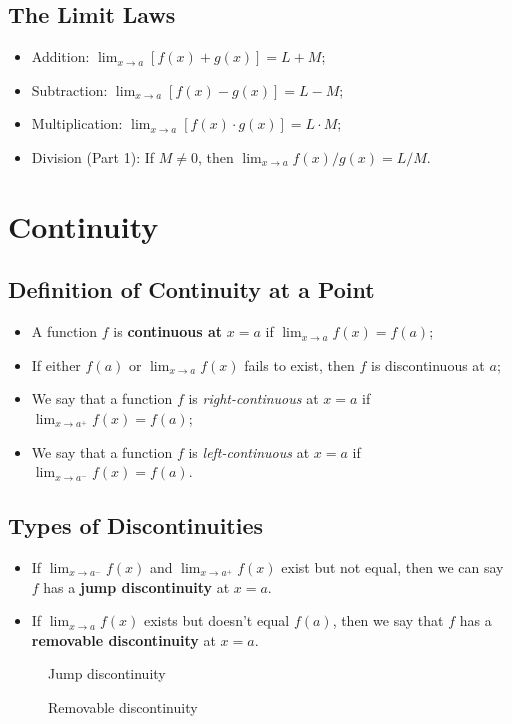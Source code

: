 \subsection{The Limit Laws}
\begin{itemize}
\item Addition: $\lim_{x\to a}[f(x)+g(x)]=L+M$;
\item Subtraction: $\lim_{x\to a}[f(x)-g(x)]=L-M$;
\item Multiplication: $\lim_{x\to a}[f(x)\cdot g(x)]=L\cdot M$;
\item Division (Part 1): If $M\neq 0$, then $\lim_{x\to a}f(x)/g(x)=L/M$.
\end{itemize}


\section{Continuity}
\subsection{Definition of Continuity at a Point}
\begin{itemize}
\item A function $f$ is \textbf{continuous at} $x=a$ if $\lim_{x\to a}f(x)=f(a)$;
\item If either $f(a)$ or $\lim_{x\to a} f(x)$ fails to exist, then $f$ is discontinuous at $a$;
\item We say that a function $f$ is \textit{right-continuous} at $x=a$ if $\lim_{x\to a^+}f(x)=f(a)$;
\item We say that a function $f$ is \textit{left-continuous} at $x=a$ if $\lim_{x\to a^-}f(x)=f(a)$.
\end{itemize}

\subsection{Types of Discontinuities}
\begin{itemize}
  \item If $\lim_{x\to a^-}f(x)$ and $\lim_{x\to a^+}f(x)$ exist but not equal, then we can say $f$ has a \textbf{jump discontinuity} at $x=a$.
  \item If $\lim_{x\to a}f(x)$ exists but doesn't equal $f(a)$, then we say that $f$ has a \textbf{removable discontinuity} at $x=a$.
\end{itemize}
\begin{figure}[H]\centering{}\caption{Jump discontinuity}\end{figure}
\begin{figure}[H]\centering{}\caption{Removable discontinuity}\end{figure}

